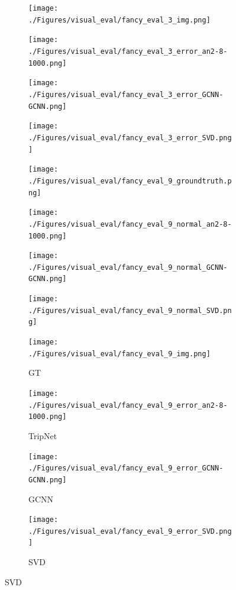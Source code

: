 \documentclass[border=15pt, multi, tikz]{article}
\begin{document}
\begin{figure}[H]
\begin{subfigure}[b]{0.24\linewidth}
	\texttt{[image: ./Figures/visual\_eval/fancy\_eval\_3\_img.png]}
\end{subfigure}
\begin{subfigure}[b]{0.24\linewidth}
	\texttt{[image: ./Figures/visual\_eval/fancy\_eval\_3\_error\_an2-8-1000.png]}
\end{subfigure}
\begin{subfigure}[b]{0.24\linewidth}
	\texttt{[image: ./Figures/visual\_eval/fancy\_eval\_3\_error\_GCNN-GCNN.png]}
\end{subfigure}
\begin{subfigure}[b]{0.24\linewidth}
	\texttt{[image: ./Figures/visual\_eval/fancy\_eval\_3\_error\_SVD.png]}
\end{subfigure}

	\begin{subfigure}[b]{0.24\linewidth}
	\texttt{[image: ./Figures/visual\_eval/fancy\_eval\_9\_groundtruth.png]}
\end{subfigure}
\begin{subfigure}[b]{0.24\linewidth}
	\texttt{[image: ./Figures/visual\_eval/fancy\_eval\_9\_normal\_an2-8-1000.png]}
\end{subfigure}
\begin{subfigure}[b]{0.24\linewidth}
	\texttt{[image: ./Figures/visual\_eval/fancy\_eval\_9\_normal\_GCNN-GCNN.png]}
\end{subfigure}
\begin{subfigure}[b]{0.24\linewidth}
	\texttt{[image: ./Figures/visual\_eval/fancy\_eval\_9\_normal\_SVD.png]}
\end{subfigure}
	
	
\begin{subfigure}[b]{0.24\linewidth}
	\texttt{[image: ./Figures/visual\_eval/fancy\_eval\_9\_img.png]}
	\caption{GT}
\end{subfigure}
\begin{subfigure}[b]{0.24\linewidth}
	\texttt{[image: ./Figures/visual\_eval/fancy\_eval\_9\_error\_an2-8-1000.png]}
	\caption{TripNet}
\end{subfigure}
\begin{subfigure}[b]{0.24\linewidth}
	\texttt{[image: ./Figures/visual\_eval/fancy\_eval\_9\_error\_GCNN-GCNN.png]}
	\caption{GCNN}
\end{subfigure}
\begin{subfigure}[b]{0.24\linewidth}
	\texttt{[image: ./Figures/visual\_eval/fancy\_eval\_9\_error\_SVD.png]}
	\caption{SVD}
\end{subfigure}
	

\end{figure}
\end{document}
